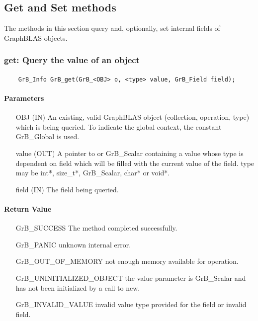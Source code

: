 \subsection{Get and Set methods}

The methods in this section query and, optionally, 
set internal fields of GraphBLAS objects.

\subsubsection{{\sf get}: Query the value of an object}

\paragraph{\syntax}

\begin{verbatim}
    GrB_Info GrB_get(GrB_<OBJ> o, <type> value, GrB_Field field);
\end{verbatim}

\paragraph{Parameters}

\begin{itemize}[leftmargin=1.1in]
    \item[{\sf OBJ}] ({\sf IN}) An existing, valid GraphBLAS object (collection, operation, type) which is being queried.
                                To indicate the global context, the constant {\sf GrB\_Global} is used.
    \item[{\sf value}] ({\sf OUT}) A pointer to or {\sf GrB\_Scalar} containing a value whose type is dependent on {\sf field} which will be
                                 filled with the current value of the field. {\sf type} may be {\sf int*}, {\sf size\_t*},
                                 {\sf GrB\_Scalar}, {\sf char*} or {\sf void*}.
    \item[{\sf field}] ({\sf IN}) The field being queried.
\end{itemize}

\paragraph{Return Value}

\begin{itemize}[leftmargin=2.1in]
\item[{\sf GrB\_SUCCESS}]  The method completed successfully.
\item[{\sf GrB\_PANIC}]             unknown internal error.
\item[{\sf GrB\_OUT\_OF\_MEMORY}]          not enough memory available for operation.
\item[{\sf GrB\_UNINITIALIZED\_OBJECT}]          the {\sf value} parameter is {\sf GrB\_Scalar} and has not been
                                    initialized by a call to {\sf new}.
\item[{\sf GrB\_INVALID\_VALUE}]    invalid value type provided for the field or invalid field.
\end{itemize}


